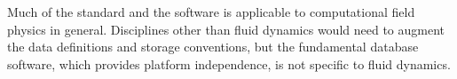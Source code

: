 Much of the standard and the software is applicable to computational
field physics in general. Disciplines other than fluid dynamics would
need to augment the data definitions and storage conventions, but the
fundamental database software, which provides platform independence, is
not specific to fluid dynamics.
